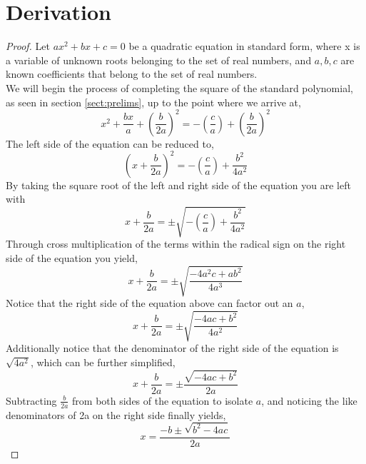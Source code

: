 \documentclass{article}
\theoremstyle{plain}
\theoremstyle{definition}
\begin{document}
\section{Derivation}    \label{sect:derive}
    \begin{proof}
    
    Let $ax^2+bx+c=0$ be a quadratic equation in standard form, where x is a variable of unknown roots belonging to the set of real numbers, and $a,b,c$ are known coefficients that belong to the set of real numbers.\\
    We will begin the process of completing the square of the standard polynomial, as seen in section \ref{sect:prelims}, up to the point where we arrive at,
    $$x^2+\frac{bx}{a}+(\frac{b}{2a})^2=-(\frac{c}{a})+(\frac{b}{2a})^2$$
    The left side of the equation can be reduced to,
    $$(x+\frac{b}{2a})^2=-(\frac{c}{a})+\frac{b^2}{4a^2}$$
    By taking the square root of the left and right side of the equation you are left with
    $$x+\frac{b}{2a}=\pm\sqrt{-(\frac{c}{a})+\frac{b^2}{4a^2}}$$
    Through cross multiplication of the terms within the radical sign on the right side of the equation you yield,
    $$x+\frac{b}{2a}=\pm\sqrt{\frac{-4a^2c+ab^2}{4a^3}}$$
    Notice that the right side of the equation above can factor out an $a$,
    $$x+\frac{b}{2a}=\pm\sqrt{\frac{-4ac+b^2}{4a^2}}$$
    Additionally notice that the denominator of the right side of the equation is $\sqrt{4a^2}$, which can be further simplified,
    $$x+\frac{b}{2a}={\pm\frac{\sqrt{-4ac+b^2}}{2a}}$$
    Subtracting $\frac{b}{2a}$ from both sides of the equation to isolate $a$, and noticing the like denominators of 2a on the right side finally yields,
     $$x=\frac{-b\pm\sqrt{b^2-4ac}}{2a}$$
    \end{proof}
\end{document}
